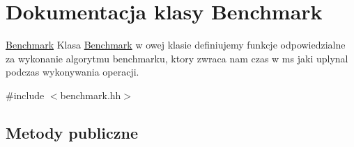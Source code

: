 \hypertarget{class_benchmark}{\section{\-Dokumentacja klasy \-Benchmark}
\label{class_benchmark}
}


\hyperlink{class_benchmark}{\-Benchmark} \-Klasa \hyperlink{class_benchmark}{\-Benchmark} w owej klasie definiujemy funkcje odpowiedzialne za wykonanie algorytmu benchmarku, ktory zwraca nam czas w ms jaki uplynal podczas wykonywania operacji.  




{\ttfamily \#include $<$benchmark.\-hh$>$}

\subsection*{\-Metody publiczne}
